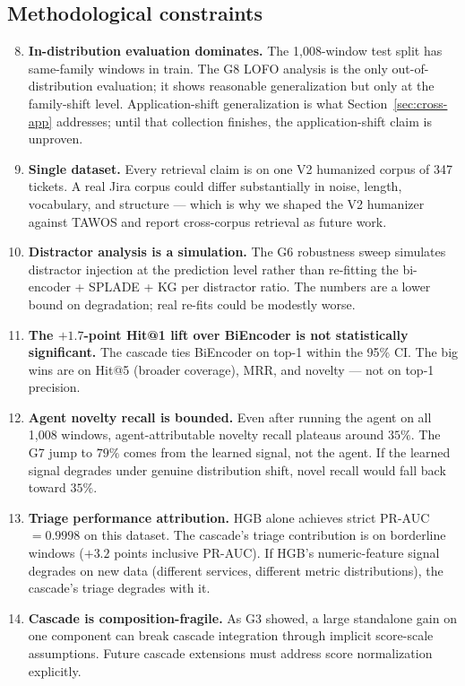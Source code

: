 \subsection{Methodological constraints}

\begin{enumerate}
\setcounter{enumi}{7}
\item \textbf{In-distribution evaluation dominates.} The 1{,}008-window test split has same-family windows in train. The G8 LOFO analysis is the only out-of-distribution evaluation; it shows reasonable generalization but only at the family-shift level. Application-shift generalization is what Section~\ref{sec:cross-app} addresses; until that collection finishes, the application-shift claim is unproven.

\item \textbf{Single dataset.} Every retrieval claim is on one V2 humanized corpus of 347 tickets. A real Jira corpus could differ substantially in noise, length, vocabulary, and structure --- which is why we shaped the V2 humanizer against TAWOS and report cross-corpus retrieval as future work.

\item \textbf{Distractor analysis is a simulation.} The G6 robustness sweep simulates distractor injection at the prediction level rather than re-fitting the bi-encoder + SPLADE + KG per distractor ratio. The numbers are a lower bound on degradation; real re-fits could be modestly worse.

\item \textbf{The $+1.7$-point Hit@1 lift over BiEncoder is not statistically significant.} The cascade ties BiEncoder on top-1 within the 95\% CI. The big wins are on Hit@5 (broader coverage), MRR, and novelty --- not on top-1 precision.

\item \textbf{Agent novelty recall is bounded.} Even after running the agent on all 1{,}008 windows, agent-attributable novelty recall plateaus around $35\%$. The G7 jump to $79\%$ comes from the learned signal, not the agent. If the learned signal degrades under genuine distribution shift, novel recall would fall back toward $35\%$.

\item \textbf{Triage performance attribution.} HGB alone achieves strict PR-AUC $= 0.9998$ on this dataset. The cascade's triage contribution is on borderline windows ($+3.2$ points inclusive PR-AUC). If HGB's numeric-feature signal degrades on new data (different services, different metric distributions), the cascade's triage degrades with it.

\item \textbf{Cascade is composition-fragile.} As G3 showed, a large standalone gain on one component can break cascade integration through implicit score-scale assumptions. Future cascade extensions must address score normalization explicitly.
\end{enumerate}

